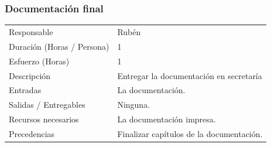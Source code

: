 \subsubsection{Documentaci\'{o}n final}
\begin{table}[H]
    \begin{center}
        \begin{tabular}{l p{8cm}}
            Responsable                           & Rub\'{e}n \\
            Duraci\'{o}n (Horas / Persona)        & 1 \\ 
            Esfuerzo (Horas)                      & 1 \\
            Descripci\'{o}n                       & Entregar la documentaci\'{o}n en secretar\'{i}a \\
            Entradas                              & La documentaci\'{o}n. \\
            Salidas / Entregables                 & Ninguna. \\
            Recursos necesarios                   & La documentaci\'{o}n impresa. \\
            Precedencias                          & Finalizar cap\'{i}tulos de la documentaci\'{o}n. \\
        \end{tabular}
    \end{center}
    
\end{table}

